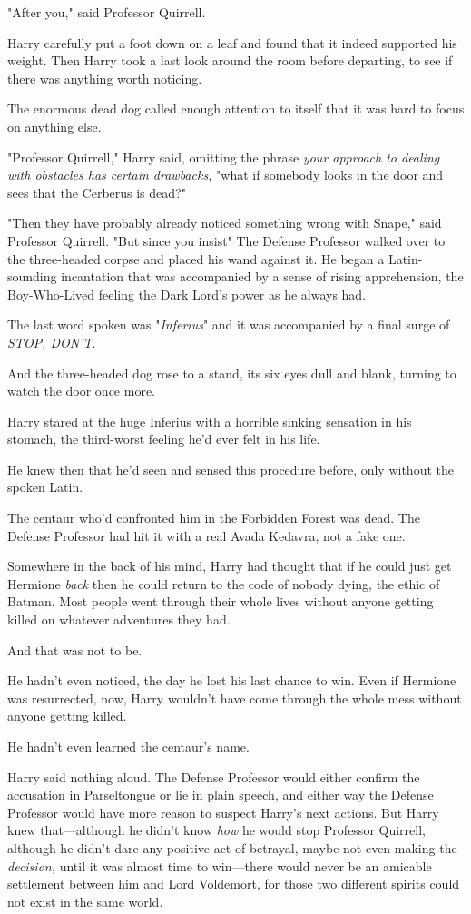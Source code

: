 "After you," said Professor Quirrell.

Harry carefully put a foot down on a leaf and found that it indeed supported
his weight. Then Harry took a last look around the room before departing, to
see if there was anything worth noticing.

The enormous dead dog called enough attention to itself that it was hard to
focus on anything else.

"Professor Quirrell," Harry said, omitting the phrase \emph{your approach to
dealing with obstacles has certain drawbacks,} "what if somebody looks in the
door and sees that the Cerberus is dead?"

"Then they have probably already noticed something wrong with Snape," said
Professor Quirrell. "But since you insist{\el}" The Defense Professor walked
over to the three-headed corpse and placed his wand against it. He began a
Latin-sounding incantation that was accompanied by a sense of rising
apprehension, the Boy-Who-Lived feeling the Dark Lord's power as he always had.

The last word spoken was "\emph{Inferius}" and it was accompanied by a final
surge of \emph{STOP, DON'T}.

And the three-headed dog rose to a stand, its six eyes dull and blank, turning
to watch the door once more.

Harry stared at the huge Inferius with a horrible sinking sensation in his
stomach, the third-worst feeling he'd ever felt in his life.

He knew then that he'd seen and sensed this procedure before, only without the
spoken Latin.

The centaur who'd confronted him in the Forbidden Forest was dead. The Defense
Professor had hit it with a real Avada Kedavra, not a fake one.

Somewhere in the back of his mind, Harry had thought that if he could just get
Hermione \emph{back} then he could return to the code of nobody dying, the
ethic of Batman. Most people went through their whole lives without anyone
getting killed on whatever adventures they had.

And that was not to be.

He hadn't even noticed, the day he lost his last chance to win. Even if
Hermione was resurrected, now, Harry wouldn't have come through the whole mess
without anyone getting killed.

He hadn't even learned the centaur's name.

Harry said nothing aloud. The Defense Professor would either confirm the
accusation in Parseltongue or lie in plain speech, and either way the Defense
Professor would have more reason to suspect Harry's next actions. But Harry
knew that---although he didn't know \emph{how} he would stop Professor
Quirrell, although he didn't dare any positive act of betrayal, maybe not even
making the \emph{decision,} until it was almost time to win---there would never
be an amicable settlement between him and Lord Voldemort, for those two
different spirits could not exist in the same world.

